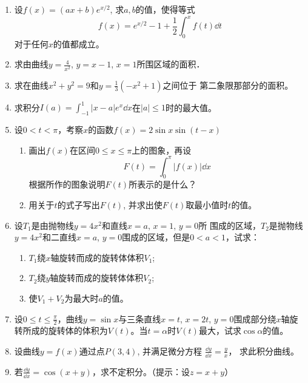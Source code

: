 \begin{enumerate}
\item 设$f(x)=(ax+b)e^{x/2}$, 求$a,b$的值，使得等式
\[f (x) =e^{x/2}-1+\frac{1}{2}\int^x_0 f (t) \dd t\]
对于任何$x$的值都成立。
\item 求由曲线$y=\frac{4}{x^2}$, $y=x-1$, $x=1$所围区域的面积．
\item 求在曲线$x^2+y^2=9$和$y=\frac{1}{3}(-x^2+1)$之间位于
第二象限那部分的面积。
\item 求积分$I(a)=\displaystyle\int^1_{-1}|x-a|e^x\dd x$在$|a|\le 1$时的最大值。
\item 设$0<t<\pi$，考察$x$的函数$f(x)=2\sin x\sin(t-x)$
\begin{enumerate}
    \item 画出$f(x)$在区间$0\le x\le \pi$上的图象，再设
    \[F (t) =\int^\pi_0 |f (x)|\dd x\]
根据所作的图象说明$F(t)$所表示的是什么？
\item 用关于$t$的式子写出$F(t)$, 并求出使$F(t)$取最小值时$t$的值。
\end{enumerate}
\item  设$T_1$是由抛物线$y=4x^2$和直线$x=a$, $x=1$, $y=0$所
围成的区域，$T_2$是抛物线$y=4x^2$和二直线$x=a$, $y=0$围成的区域，但是$0<a<1$，试求：
\begin{enumerate}
\item $T_1$绕$x$轴旋转而成的旋转体体积$V_1$;    \item $T_2$绕$y$轴旋转而成的旋转体体积$V_2$;    \item 使$V_1+V_2$为最大时$a$的值。
\end{enumerate}
\item 设$0\le t\le \frac{\pi}{2}$，曲线$y=\sin x$与三条直线$x=t$, $x=2t$, 
$y=0$围成部分绕$x$轴旋转所成的旋转体的体积为$V(t)$。当$t=\alpha$时$V(t)$最大，试求$\cos\alpha$的值。
\item 设曲线$y=f(x)$通过点$P(3, 4)$, 并满足微分方程
$\frac{\dd y}{\dd x}=\frac{y}{x}$，
求此积分曲线。

\item 若$\frac{\dd y}{\dd x}=\cos(x+y)$，求不定积分。（提示：设$z=x+y$）
\end{enumerate}
